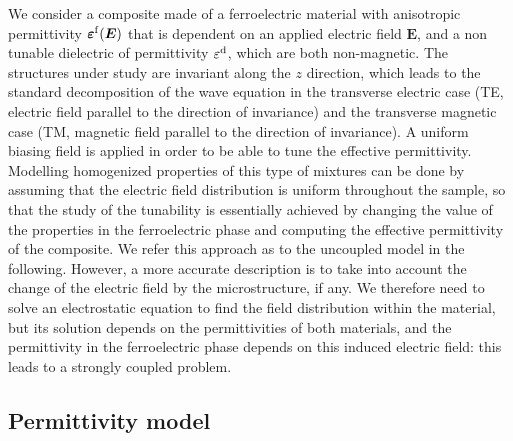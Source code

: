 \documentclass[%
 aip,
 amsmath,amssymb,
 reprint,%
linenumbers
]{revtex4-1}
\newcommand{\B}{\boldsymbol}
\newcommand{\tens}[1]{\B{#1}}
\newcommand{\epsftens}{\tens{\varepsilon}^{\rm f}}
\newcommand{\epsd}{\varepsilon^{\rm d}}
\begin{document}
We consider a composite made of a ferroelectric material with anisotropic
permittivity $\epsftens(\B E)$
that is dependent on an applied electric field $\B E$,
and a non tunable dielectric of permittivity $\epsd$, which are both non-magnetic.
The structures under study are invariant along the $z$ direction, which leads to the standard decomposition
of the wave equation in the transverse electric case (TE, electric field parallel
to the direction of invariance) and the
transverse magnetic case (TM, magnetic field parallel to the direction
of invariance).
A uniform biasing field is applied in order to be able to tune the effective permittivity.
 Modelling homogenized properties of this type of mixtures can be done by assuming
that the electric field distribution is uniform throughout the sample,
so that the study of the tunability is
essentially achieved by changing the value of the properties in the
ferroelectric phase and computing the effective permittivity of the composite.
We refer this approach as to the uncoupled model in the following.
However, a more accurate description is to take into account the change of the
electric field by the microstructure, if any. We therefore need to solve an
electrostatic equation to find the field distribution within the material, but its solution
depends on the permittivities of both materials, and the permittivity in the
ferroelectric phase depends on this induced electric field: this leads to a strongly coupled problem.\\

\subsection{Permittivity model\label{permmodel}}
\end{document}
